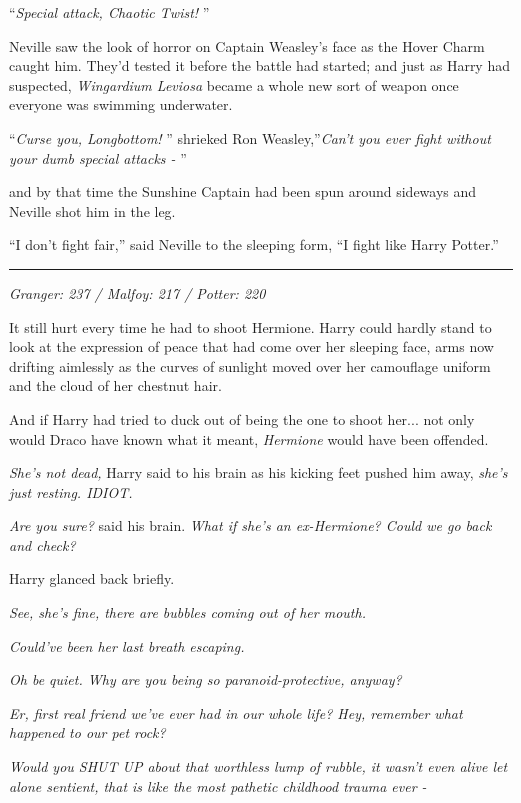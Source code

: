 ``\emph{Special attack, Chaotic Twist!} ''

Neville saw the look of horror on Captain Weasley's face as the Hover
Charm caught him. They'd tested it before the battle had started; and
just as Harry had suspected, \emph{Wingardium Leviosa} became a whole
new sort of weapon once everyone was swimming underwater.

``\emph{Curse you, Longbottom!} '' shrieked Ron Weasley,''\emph{Can't you
ever fight without your dumb special attacks -} ''

and by that time the Sunshine Captain had been spun around sideways and
Neville shot him in the leg.

``I don't fight fair,'' said Neville to the sleeping form, ``I fight
like Harry Potter.''

\begin{center}\rule{3in}{0.4pt}\end{center}

\emph{Granger: 237 / Malfoy: 217 / Potter: 220}

It still hurt every time he had to shoot Hermione. Harry could hardly
stand to look at the expression of peace that had come over her sleeping
face, arms now drifting aimlessly as the curves of sunlight moved over
her camouflage uniform and the cloud of her chestnut hair.

And if Harry had tried to duck out of being the one to shoot her...
not only would Draco have known what it meant, \emph{Hermione} would
have been offended.

\emph{She's not dead,} Harry said to his brain as his kicking feet
pushed him away, \emph{she's just resting. IDIOT.}

\emph{Are you sure?} said his brain. \emph{What if she's an ex-Hermione?
Could we go back and check?}

Harry glanced back briefly.

\emph{See, she's fine, there are bubbles coming out of her mouth.}

\emph{Could've been her last breath escaping.}

\emph{Oh be quiet. Why are you being so paranoid-protective, anyway?}

\emph{Er, first real friend we've ever had in our whole life? Hey,
remember what happened to our pet rock?}

\emph{Would you SHUT UP about that worthless lump of rubble, it wasn't
even alive let alone sentient, that is like the most pathetic childhood
trauma ever -}

